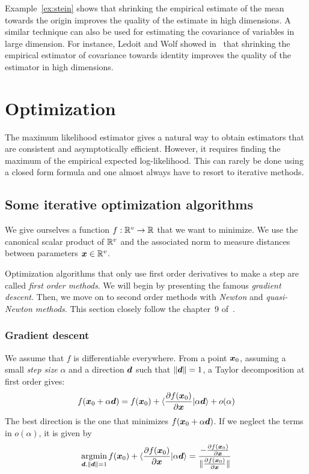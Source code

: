 Example~\ref{ex:stein} shows that shrinking the empirical estimate of the mean towards the
origin improves the quality of the estimate in high dimensions. A similar technique can also be used for
estimating the covariance of variables in large dimension. For instance, Ledoit
and Wolf showed in~\cite{ledoit2004well} that shrinking the empirical estimator
of covariance towards identity improves the quality of the estimator in high dimensions.

\section{Optimization}
The maximum likelihood estimator gives a natural way to obtain estimators that
are consistent and asymptotically efficient.
However, it requires finding the maximum of the empirical expected
log-likelihood.
This can rarely be done using a closed form formula and one almost always have
to resort to iterative methods.


\subsection{Some iterative optimization algorithms}
We give ourselves a function $f: \mathbb{R}^v \rightarrow \mathbb{R}$ that we
want to minimize. We use the canonical scalar product of $\mathbb{R}^v$ and the
associated norm to measure distances between parameters $\boldsymbol{x} \in \mathbb{R}^v$.


Optimization algorithms that only use first order derivatives to make a step are
called \emph{first order methods}. We will begin by presenting the famous
\emph{gradient descent}. Then, we move on to second order methods with \emph{Newton} and
\emph{quasi-Newton methods}. This section closely follow the chapter~9 of~\cite{boyd2004convex}.

\subsubsection{Gradient descent}
We assume that $f$ is differentiable everywhere.
From a point $\boldsymbol{x}_0$, assuming a small \emph{step size} $\alpha$ and a direction
$\boldsymbol{d}$ such that $\|\boldsymbol{d}\| = 1$, a Taylor decomposition at first order gives:
\begin{align}
f(\boldsymbol{x}_0 + \alpha \boldsymbol{d}) = f(\boldsymbol{x}_0) + \langle \frac{ \partial f(\boldsymbol{x}_0)}{\partial \boldsymbol{x}} | \alpha \boldsymbol{d} \rangle + o(\alpha) 
\end{align}
The best direction is the one that minimizes $f(\boldsymbol{x}_0 + \alpha \boldsymbol{d})$. If we
neglect the terms in $o(\alpha)$, it is given by
\begin{align}
  \operatorname*{argmin}_{\boldsymbol{d}, \|\boldsymbol{d}\| = 1} f(\boldsymbol{x}_0) + \langle \frac{ \partial f(\boldsymbol{x}_0)}{\partial \boldsymbol{x}} | \alpha \boldsymbol{d} \rangle = \frac{-\frac{ \partial f(\boldsymbol{x}_0)}{\partial \boldsymbol{x}}}{\|\frac{ \partial f(\boldsymbol{x}_0)}{\partial \boldsymbol{x}}\|}
\end{align}

